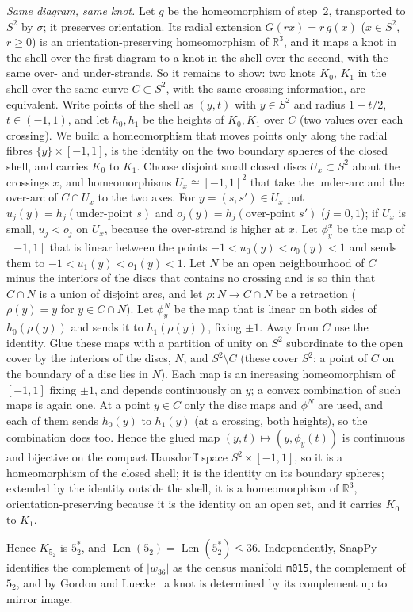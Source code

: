 \documentclass[11pt]{article}
\theoremstyle{plain}
\theoremstyle{definition}
\theoremstyle{remark}
\newcommand{\Len}{\operatorname{Len}}
\newcommand{\R}{\mathbb{R}}
\newcommand{\Kft}{K_{5_2}}
\begin{document}
\begin{enumerate}
\emph{Same diagram, same knot.} Let $g$ be the homeomorphism of step~2, transported to $S^2$ by
$\sigma$; it preserves orientation. Its radial extension $G(rx)=r\,g(x)$ ($x\in S^2$, $r\ge0$) is an
orientation-preserving homeomorphism of $\R^3$, and it maps a knot in the shell over the first diagram
to a knot in the shell over the second, with the same over- and under-strands. So it remains to show:
two knots $K_0$, $K_1$ in the shell over the same curve $C\subset S^2$, with the same crossing
information, are equivalent. Write points of the shell as $(y,t)$ with $y\in S^2$ and radius $1+t/2$,
$t\in(-1,1)$, and let $h_0,h_1$ be the heights of $K_0,K_1$ over $C$ (two values over each crossing). We
build a homeomorphism that moves points only along the radial fibres $\{y\}\times[-1,1]$, is the
identity on the two boundary spheres of the closed shell, and carries $K_0$ to $K_1$.
Choose disjoint small closed discs $U_x\subset S^2$ about the crossings $x$, and homeomorphisms
$U_x\cong[-1,1]^2$ that take the under-arc and the over-arc of $C\cap U_x$ to the two axes. For
$y=(s,s')\in U_x$ put $u_j(y)=h_j(\text{under-point }s)$ and $o_j(y)=h_j(\text{over-point }s')$
($j=0,1$); if $U_x$ is small, $u_j<o_j$ on $U_x$, because the over-strand is higher at $x$. Let
$\phi^x_y$ be the map of $[-1,1]$ that is linear between the points $-1<u_0(y)<o_0(y)<1$ and sends them to
$-1<u_1(y)<o_1(y)<1$. Let $N$ be an open neighbourhood of $C$ minus the interiors of the discs that
contains no crossing and is so thin that $C\cap N$ is a union of disjoint arcs, and let $\rho:N\to C\cap N$
be a retraction ($\rho(y)=y$ for $y\in C\cap N$). Let $\phi^N_y$ be the map that is linear on both sides of $h_0(\rho(y))$ and sends it to
$h_1(\rho(y))$, fixing $\pm1$. Away from $C$ use the identity. Glue these maps with a partition of unity
on $S^2$ subordinate to the open cover by the interiors of the discs, $N$, and $S^2\setminus C$ (these
cover $S^2$: a point of $C$ on the boundary of a disc lies in $N$). Each map is an increasing
homeomorphism of $[-1,1]$ fixing $\pm1$, and depends continuously on $y$; a convex combination of such
maps is again one. At a point $y\in C$ only the disc maps and $\phi^N$ are used, and each of them sends
$h_0(y)$ to $h_1(y)$ (at a crossing, both heights), so the combination does too. Hence the glued map
$(y,t)\mapsto(y,\phi_y(t))$ is continuous and bijective on the compact Hausdorff space $S^2\times[-1,1]$,
so it is a homeomorphism of the closed shell; it is the identity on its boundary spheres; extended by the identity outside the shell, it is a homeomorphism of $\R^3$, orientation-preserving
because it is the identity on an open set, and it carries $K_0$ to $K_1$.
\end{enumerate}
Hence $\Kft$ is $5_2^*$, and $\Len(5_2)=\Len(5_2^*)\le36$. Independently, SnapPy~\cite{SnapPy}
identifies the complement of $|w_{36}|$ as the census manifold \texttt{m015}, the complement of
$5_2$, and by Gordon and Luecke~\cite{GL89} a knot is determined by its complement up to mirror image.
\end{document}

